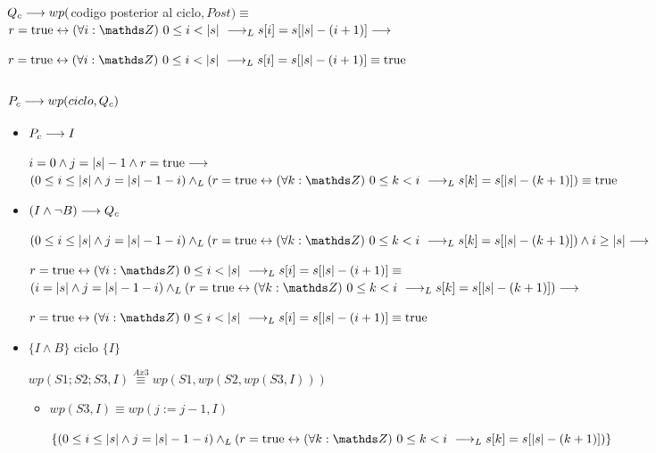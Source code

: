 \documentclass{article}
\begin{document}
$Q_{c} \longrightarrow wp($codigo posterior al ciclo$, Post) \equiv$ \\

$r = \True \Iff \paraTodo{i}{0}{\longitud{s}} \implicaLuego s[i]=s[\longitud{s}-(i+1)] \implica$

$r = \True \Iff \paraTodo{i}{0}{\longitud{s}} \implicaLuego s[i]=s[\longitud{s}-(i+1)] \equiv \True$

\subsubsection*{$P_{c} \longrightarrow wp(ciclo, Q_{c})$}

\begin{itemize}
    \item $P_{c} \longrightarrow I$

    $i = 0 \wedge j = |s|-1 \wedge r = \mathrm{true} \longrightarrow$
    $(0 \leq i \leq \longitud{s} \wedge j = \longitud{s}-1-i) \yLuego (r = \True \Iff \paraTodo{k}{0}{i} \implicaLuego s[k]=s[\longitud{s}-(k+1)]) \equiv \True$

    \item $(I \wedge \neg B) \longrightarrow Q_{c}$
    
    $(0 \leq i \leq \longitud{s} \wedge j = \longitud{s}-1-i) \yLuego (r = \True \Iff \paraTodo{k}{0}{i} \implicaLuego s[k]=s[\longitud{s}-(k+1)]) \wedge i \geq \longitud{s} \implica$

    $r = \True \Iff \paraTodo{i}{0}{\longitud{s}} \implicaLuego s[i]=s[\longitud{s}-(i+1)] \equiv$ \\

    $(i = \longitud{s} \wedge j = \longitud{s}-1-i) \yLuego (r = \True \Iff \paraTodo{k}{0}{i} \implicaLuego s[k]=s[\longitud{s}-(k+1)]) \implica$

    $r = \True \Iff \paraTodo{i}{0}{\longitud{s}} \implicaLuego s[i]=s[\longitud{s}-(i+1)] \equiv \True$ \\

    \item $\{I \wedge B\}$ ciclo $\{ I \}$
    
    $wp(S1;S2;S3, I) \stackrel{Ax3}{\equiv} wp(S1,wp(S2,wp(S3,I)))$

    \begin{itemize}
        \item $wp(S3, I) \equiv wp(j:= j-1, I)$

        $ \{ (0 \leq i \leq \longitud{s} \wedge j = \longitud{s}-1-i) \yLuego (r = \True \Iff \paraTodo{k}{0}{i} \implicaLuego s[k]=s[\longitud{s}-(k+1)]) \} $


\end{itemize}
\end{itemize}
\end{document}
